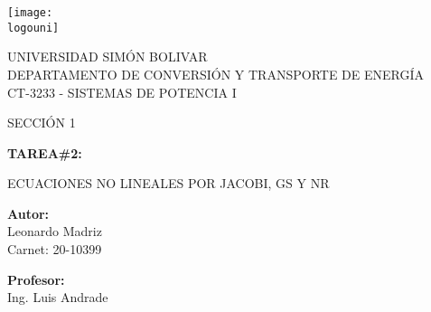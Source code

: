\documentclass[12pt,a4paper]{article} %
\newcommand{\logouni}{Imagenes/Logo.png}
\begin{document}
	\begin{titlepage}
		\centering
		\texttt{[image: \\logouni]}\par\vspace{0.2cm}
		{\scshape\LARGE UNIVERSIDAD SIMÓN BOLIVAR}\vspace{0.2cm}\\
		{\scshape \large DEPARTAMENTO DE CONVERSIÓN Y TRANSPORTE DE ENERGÍA}\vspace{0.2cm}\\
		{\large CT-3233 - SISTEMAS DE POTENCIA I}\par
		{\large SECCIÓN 1}\par
		\vspace{5cm}
		\centering
		{\scshape \LARGE \textbf{TAREA\#2:}\par \vspace{0.2cm} ECUACIONES NO LINEALES POR JACOBI, GS Y NR}\par
		\vspace{5cm}
		\begin{minipage}{0.25\textwidth}
			{\large \textbf{Autor:}}\\
			{\large Leonardo Madriz \\ Carnet:  20-10399}
		\end{minipage}
		\hfill
		\begin{minipage}{0.25\textwidth}
			{\large \textbf{Profesor:}}\\
			{\large Ing. Luis Andrade}
		\end{minipage}
	\end{titlepage}
	\clearpage
  	\tableofcontents
	\clearpage
	
	
	
    
    
    
\end{document}
